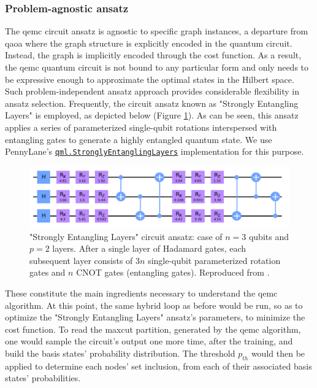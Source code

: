 \subsubsection*{\small Problem-agnostic ansatz}
The \acrshort{qemc} circuit ansatz is agnostic to specific graph instances, a departure from \acrshort{qaoa} where the graph structure is explicitly encoded in the quantum circuit. Instead, the graph is implicitly encoded through the cost function. As a result, the \acrshort{qemc} quantum circuit is not bound to any particular form and only needs to be expressive enough to approximate the optimal states in the Hilbert space. Such problem-independent ansatz approach provides considerable flexibility in ansatz selection. Frequently, the circuit ansatz known as "Strongly Entangling Layers" is employed, as depicted below (Figure \ref{fig:Strongly_Entangling_Layers}). As can be seen, this ansatz applies a series of parameterized single-qubit rotations interspersed with entangling gates to generate a highly entangled quantum state. We use PennyLane's \href{https://docs.pennylane.ai/en/stable/code/api/pennylane.StronglyEntanglingLayers.html}{\texttt{qml.StronglyEntanglingLayers}} implementation for this purpose.

\begin{figure}[H]
    \centering
    \includegraphics[width = 0.85\linewidth]{Figures/Diagrams/Strongly_Entangling_Layers.png}
    \caption{"Strongly Entangling Layers" circuit ansatz: case of $n = 3$ qubits and $p = 2$ layers. After a single layer of Hadamard gates, each subsequent layer consists of $3n$ single-qubit parameterized rotation gates and $n$ CNOT gates (entangling gates). Reproduced from \cite{tenecohen2023variational}.}
    \label{fig:Strongly_Entangling_Layers}
\end{figure}

These constitute the main ingredients necessary to understand the \acrshort{qemc} algorithm. At this point, the same hybrid loop as before would be run, so as to optimize the "Strongly Entangling Layers" ansatz's parameters, to minimize the cost function. To read the \acrshort{maxcut} partition, generated by the \acrshort{qemc} algorithm, one would sample the circuit's output one more time, after the training, and build the basis states' probability distribution. The threshold $p_{th}$ would then be applied to determine each nodes' set inclusion, from each of their associated basis states' probabilities.

